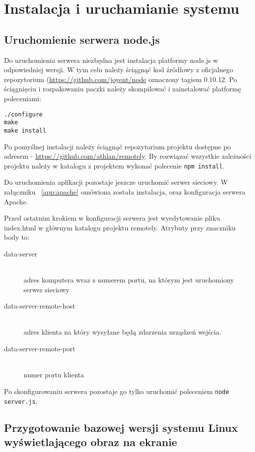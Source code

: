 \section{Instalacja i uruchamianie systemu}

\subsection{Uruchomienie serwera node.js}

Do uruchomienia serwera niezbędna jest instalacja platformy node.js w odpowiedniej wersji. W tym celu należy ściągnąć kod źródłowy z oficjalnego repozytorium (\url{https://github.com/joyent/node} oznaczony tagiem 0.10.12. Po ściągnięciu i rozpakowaniu paczki należy skompilować i zainstalować platformę poleceniami:

\begin{lstlisting}
./configure
make
make install
\end{lstlisting}

Po pomyślnej instalacji należy ściągnąć repozytorium projektu dostępne po adresem - \url{https://github.com/athlan/remotely}. By rozwiązać wszystkie zależności projektu należy w katalogu z projektem wykonać polecenie \lstinline{npm install}.
\par
Do uruchomienia aplikacji pozostaje jeszcze uruchomić serwer sieciowy. W załączniku ~\ref{app:apache} omówiona została instalacja, oraz konfiguracja serwera Apache.
\par
Przed ostatnim krokiem w konfiguracji serwera jest wyedytowanie pliku index.html w głównym katalogu projektu remotely. Atrybuty przy znaczniku body to:
\begin{description}
	\item[data-server] \hfill \\
		adres komputera wraz z numerem portu, na którym jest uruchomiony serwer sieciowy
	\item[data-server-remote-host] \hfill \\
		adres klienta na który wysyłane będą zdarzenia urządzeń wejścia.
	\item[data-server-remote-port] \hfill \\
		numer portu klienta
\end{description}
\par
Po skonfigurowaniu serwera pozostaje go tylko uruchomić poleceniem \lstinline{node server.js}.


\subsection{Przygotowanie bazowej wersji systemu Linux wyświetlającego obraz na ekranie}


